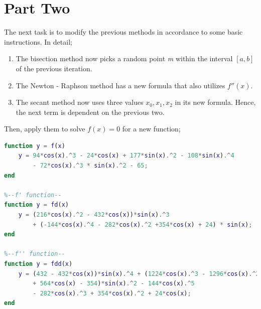 \documentclass{article}
\begin{document}
\section{Part Two}
The next task is to modify the previous methods in accordance to some basic instructions. In detail;
\begin{enumerate}
    \item The bisection method now picks a random point \emph{m} within the interval $[a,b]$ of the previous iteration.
    \item The Newton - Raphson method has a new formula that also utilizes $f''(x)$.
    \item The secant method now uses three values $x_0,x_1,x_2$ in its new formula. Hence, the next term is dependent on the previous two.
\end{enumerate}
Then, apply them to solve $f(x)=0$ for a new function;
\begin{lstlisting}[language=Matlab]
%--f function--
function y = f(x)
    y = 94*cos(x).^3 - 24*cos(x) + 177*sin(x).^2 - 108*sin(x).^4
        - 72*cos(x).^3 * sin(x).^2 - 65;
end

%--f' function--
function y = fd(x)
    y = (216*cos(x).^2 - 432*cos(x))*sin(x).^3
        + (-144*cos(x).^4 - 282*cos(x).^2 +354*cos(x) + 24) * sin(x);
end

%--f'' function--
function y = fdd(x)
    y = (432 - 432*cos(x))*sin(x).^4 + (1224*cos(x).^3 - 1296*cos(x).^2 
        + 564*cos(x) - 354)*sin(x).^2 - 144*cos(x).^5 
        - 282*cos(x).^3 + 354*cos(x).^2 + 24*cos(x);
end
\end{lstlisting}
\pagebreak
\end{document}
